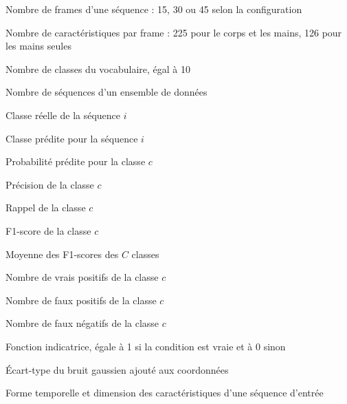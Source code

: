 \begin{listofsymbols}[4cm]
\item [$T$] Nombre de frames d'une séquence : 15, 30 ou 45 selon la configuration
\item [$D$] Nombre de caractéristiques par frame : 225 pour le corps et les mains, 126 pour les mains seules
\item [$C$] Nombre de classes du vocabulaire, égal à 10
\item [$N$] Nombre de séquences d'un ensemble de données
\item [$y_i$] Classe réelle de la séquence $i$
\item [$\hat{y}_i$] Classe prédite pour la séquence $i$
\item [$p_c$] Probabilité prédite pour la classe $c$
\item [$P_c$] Précision de la classe $c$
\item [$R_c$] Rappel de la classe $c$
\item [$F_{1,c}$] F1-score de la classe $c$
\item [$F_{1,\mathrm{macro}}$] Moyenne des F1-scores des $C$ classes
\item [$TP_c$] Nombre de vrais positifs de la classe $c$
\item [$FP_c$] Nombre de faux positifs de la classe $c$
\item [$FN_c$] Nombre de faux négatifs de la classe $c$
\item [$\mathbf{1}(\cdot)$] Fonction indicatrice, égale à 1 si la condition est vraie et à 0 sinon
\item [$\sigma$] Écart-type du bruit gaussien ajouté aux coordonnées
\item [\texttt{[T,D]}] Forme temporelle et dimension des caractéristiques d'une séquence d'entrée
\end{listofsymbols}
